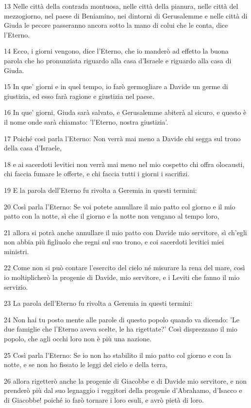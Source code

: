 \par 13 Nelle città della contrada montuosa, nelle città della pianura, nelle città del mezzogiorno, nel paese di Beniamino, nei dintorni di Gerusalemme e nelle città di Giuda le pecore passeranno ancora sotto la mano di colui che le conta, dice l'Eterno.
\par 14 Ecco, i giorni vengono, dice l'Eterno, che io manderò ad effetto la buona parola che ho pronunziata riguardo alla casa d'Israele e riguardo alla casa di Giuda.
\par 15 In que' giorni e in quel tempo, io farò germogliare a Davide un germe di giustizia, ed esso farà ragione e giustizia nel paese.
\par 16 In que' giorni, Giuda sarà salvato, e Gerusalemme abiterà al sicuro, e questo è il nome onde sarà chiamato: 'l'Eterno, nostra giustizia'.
\par 17 Poiché così parla l'Eterno: Non verrà mai meno a Davide chi segga sul trono della casa d'Israele,
\par 18 e ai sacerdoti levitici non verrà mai meno nel mio cospetto chi offra olocausti, chi faccia fumare le offerte, e chi faccia tutti i giorni i sacrifizi.
\par 19 E la parola dell'Eterno fu rivolta a Geremia in questi termini:
\par 20 Così parla l'Eterno: Se voi potete annullare il mio patto col giorno e il mio patto con la notte, sì che il giorno e la notte non vengano al tempo loro,
\par 21 allora si potrà anche annullare il mio patto con Davide mio servitore, sì ch'egli non abbia più figliuolo che regni sul suo trono, e coi sacerdoti levitici miei ministri.
\par 22 Come non si può contare l'esercito del cielo né misurare la rena del mare, così io moltiplicherò la progenie di Davide, mio servitore, e i Leviti che fanno il mio servizio.
\par 23 La parola dell'Eterno fu rivolta a Geremia in questi termini:
\par 24 Non hai tu posto mente alle parole di questo popolo quando va dicendo: 'Le due famiglie che l'Eterno aveva scelte, le ha rigettate?' Così disprezzano il mio popolo, che agli occhi loro non è più una nazione.
\par 25 Così parla l'Eterno: Se io non ho stabilito il mio patto col giorno e con la notte, e se non ho fissato le leggi del cielo e della terra,
\par 26 allora rigetterò anche la progenie di Giacobbe e di Davide mio servitore, e non prenderò più dal suo legnaggio i reggitori della progenie d'Abrahamo, d'Isacco e di Giacobbe! poiché io farò tornare i loro esuli, e avrò pietà di loro.

